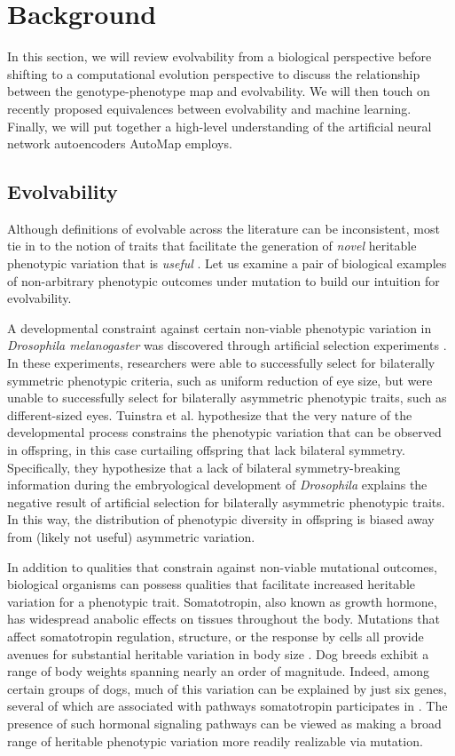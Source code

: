 \section{Background} \label{sec:background}

In this section, we will review evolvability from a biological perspective before shifting to a computational evolution perspective to discuss the relationship between the genotype-phenotype map and evolvability.
We will then touch on recently proposed equivalences between evolvability and machine learning.
Finally, we will put together a high-level understanding of the artificial neural network autoencoders AutoMap employs.

\subsection{Evolvability}
Although definitions of evolvable across the literature can be inconsistent, most tie in to the notion of traits that facilitate the generation of \textit{novel} heritable phenotypic variation that is \textit{useful} \cite{tarapore2015evolvability}.
Let us examine a pair of biological examples of non-arbitrary phenotypic outcomes under mutation to build our intuition for evolvability.

A developmental constraint against certain non-viable phenotypic variation in  \textit{Drosophila melanogaster} was discovered through artificial selection experiments \cite{coyne1987lack, tuinstra1990lack}.
In these experiments,  researchers were able to successfully select for bilaterally symmetric phenotypic criteria, such as uniform reduction of eye size, but were unable to successfully select for bilaterally asymmetric phenotypic traits, such as different-sized eyes.
Tuinstra et al. hypothesize that the very nature of the developmental process constrains the phenotypic variation that can be observed in offspring, in this case curtailing offspring that lack bilateral symmetry.
Specifically, they hypothesize that a lack of bilateral symmetry-breaking information during the embryological development of \textit{Drosophila} explains the negative result of artificial selection for bilaterally asymmetric phenotypic traits.
In this way, the distribution of phenotypic diversity in offspring is biased away from (likely not useful) asymmetric variation.

In addition to qualities that constrain against non-viable mutational outcomes, biological organisms can possess qualities that facilitate increased heritable variation for a phenotypic trait.
Somatotropin, also known as growth hormone, has widespread anabolic effects on tissues throughout the body.
Mutations that affect somatotropin regulation, structure, or the response by cells all provide avenues for substantial heritable variation in body size \cite{devesa2016multiple}.
Dog breeds exhibit a range of body weights spanning nearly an order of magnitude.
Indeed, among certain groups of dogs, much of this variation can be explained by just six genes, several of which are associated with pathways somatotropin participates in \cite{rimbault2013derived}.
The presence of such hormonal signaling pathways can be viewed as making a broad range of heritable phenotypic variation more readily realizable via mutation.


